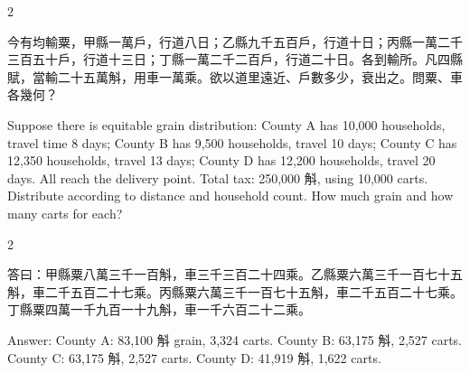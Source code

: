 \documentclass[10pt,a4paper]{article}
\begin{document}
\begin{paracol}{2}

\begin{leftcolumn*}
\begin{problembi}
今有均輸粟，甲縣一萬戶，行道八日；乙縣九千五百戶，行道十日；丙縣一萬二千三百五十戶，行道十三日；丁縣一萬二千二百戶，行道二十日。各到輸所。凡四縣賦，當輸二十五萬斛，用車一萬乘。欲以道里遠近、戶數多少，衰出之。問粟、車各幾何？
\end{problembi}
\end{leftcolumn*}

\begin{rightcolumn*}
\begin{problembi}
Suppose there is equitable grain distribution: County A has 10,000 households, travel time 8 days; County B has 9,500 households, travel 10 days; County C has 12,350 households, travel 13 days; County D has 12,200 households, travel 20 days. All reach the delivery point. Total tax: 250,000 斛, using 10,000 carts. Distribute according to distance and household count. How much grain and how many carts for each?
\end{problembi}
\end{rightcolumn*}

\end{paracol}

\begin{paracol}{2}

\begin{leftcolumn*}
\begin{answerbi}[\textbf{答}]
答曰：甲縣粟八萬三千一百斛，車三千三百二十四乘。乙縣粟六萬三千一百七十五斛，車二千五百二十七乘。丙縣粟六萬三千一百七十五斛，車二千五百二十七乘。丁縣粟四萬一千九百一十九斛，車一千六百二十二乘。
\end{answerbi}
\end{leftcolumn*}

\begin{rightcolumn*}
\begin{answerbi}
Answer: County A: 83,100 斛 grain, 3,324 carts. County B: 63,175 斛, 2,527 carts. County C: 63,175 斛, 2,527 carts. County D: 41,919 斛, 1,622 carts.
\end{answerbi}
\end{rightcolumn*}

\end{paracol}
\end{document}
